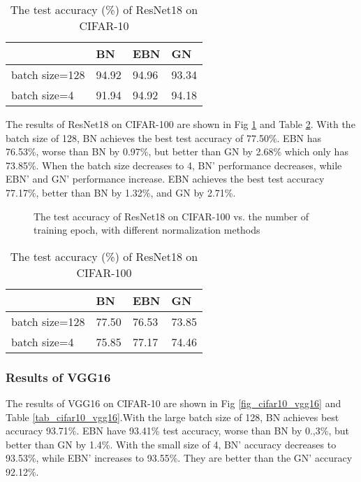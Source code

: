 \documentclass[runningheads]{llncs}
\begin{document}
\begin{table}[!htb]
\caption{The test accuracy (\%) of ResNet18 on CIFAR-10}
\label{tab_cifar10}
\centering
\begin{tabular}{l|lll}
\hline
  & BN & EBN & GN \\
\hline
batch size=128     & 94.92  & 94.96 & 93.34     \\
batch size=4       & 91.94  & 94.92 & 94.18     \\
\hline
\end{tabular}
\end{table}



The results of ResNet18 on CIFAR-100 are shown in Fig \ref{fig_cifar100}  and Table \ref{tab_cifar100}.
With the batch size of 128, BN achieves the best test accuracy of 77.50\%. EBN has 76.53\%, worse than BN by 0.97\%, but better than GN by 2.68\% which only has 73.85\%. When the batch size decreases to 4, BN' performance decreases, while EBN' and GN' performance increase. EBN achieves the best test accuracy 77.17\%, better than BN by 1.32\%, and GN by 2.71\%.

\begin{figure}[!htb]
\centering
{}
\centering
{}
\caption{The test accuracy of ResNet18 on CIFAR-100 vs. the number of training epoch, with different normalization methods}
\label{fig_cifar100}
\end{figure}

\begin{table}[!htb]
\caption{The test accuracy (\%) of ResNet18 on CIFAR-100}
\label{tab_cifar100}
\centering
\begin{tabular}{l|lll}
\hline
  & BN & EBN & GN \\
\hline
batch size=128     & 77.50  & 	76.53 & 73.85     \\
batch size=4       & 75.85  & 77.17 & 74.46     \\
\hline
\end{tabular}
\end{table}


\subsubsection{Results of VGG16}

The results of VGG16 on CIFAR-10 are shown in Fig \ref{fig_cifar10_vgg16}  and Table \ref{tab_cifar10_vgg16}.With the large batch size of 128, BN achieves best accuracy 93.71\%. EBN have 93.41\% test accuracy, worse than BN by 0.,3\%, but better than GN by 1.4\%.  
With the small size of 4, BN' accuracy decreases to 93.53\%, while EBN' increases to 93.55\%. They are better than the GN' accuracy 92.12\%.
\end{document}

